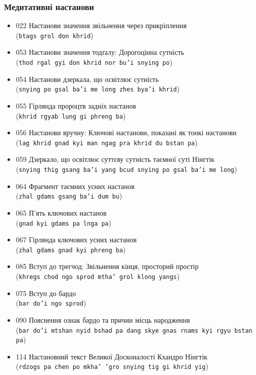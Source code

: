 \documentclass{article}
\begin{document}
\subsubsection{Медитативні настанови}

\begingroup\raggedright
\begin{itemize}
\item 022 Настанови значення звільнення через прикріплення \\ (\texttt{btags grol don khrid})
\item 053 Настанови значення тодґалу: Дорогоцінна сутність \\ (\texttt{thod rgal gyi don khrid nor bu'i snying po})
\item 054 Настанови дзеркала, що освітлює сутність \\ (\texttt{snying po gsal ba'i me long zhes bya'i khrid})
\item 055 Гірлянда пророцтв задніх настанов \\ (\texttt{khrid rgyab lung gi phreng ba})
\item 056 Настанови вручну: Ключові настанови, показані як тонкі настанови \\ (\texttt{lag khrid gnad kyi man ngag pra khrid du bstan pa})
\item 059 Дзеркало, що освітлює суттєву сутність таємної суті Нінгтік \\ (\texttt{snying thig gsang ba'i yang bcud snying po gsal ba'i me long})
\item 064 Фрагмент таємних усних настанов \\ (\texttt{zhal gdams gsang ba'i dum bu})
\item 065 П'ять ключових настанов \\ (\texttt{gnad kyi gdams pa lnga pa})
\item 067 Гірлянда ключових усних настанов \\ (\texttt{zhal gdams gnad kyi phreng ba})
\item 085 Вступ до трегчод: Звільнення кінця, просторий простір \\ (\texttt{khregs chod ngo sprod mtha' grol klong yangs})
\item 075 Вступ до бардо \\ (\texttt{bar do'i ngo sprod})
\item 090 Пояснення ознак бардо та причин місць народження \\ (\texttt{bar do'i mtshan nyid bshad pa dang skye gnas rnams kyi rgyu bstan pa})
\item 114 Настановний текст Великої Досконалості Кхандро Нінгтік \\ (\texttt{rdzogs pa chen po mkha' 'gro snying tig gi khrid yig})
\end{itemize}
\endgroup
\end{document}
